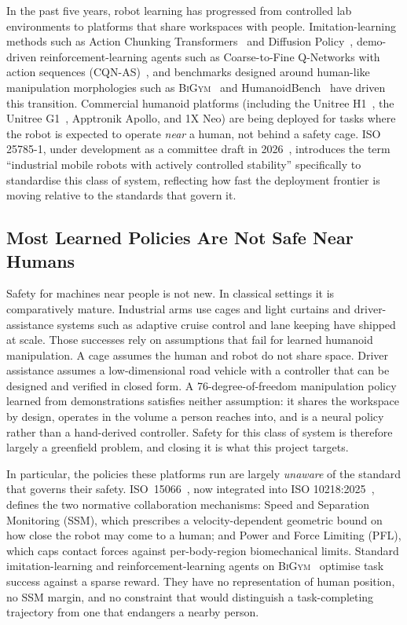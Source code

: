 \documentclass[11pt,a4paper]{report}
\newcommand{\ssm}{SSM}
\newcommand{\pfl}{PFL}
\newcommand{\iso}{ISO~15066}
\newcommand{\bigym}{\textsc{BiGym}}
\newcommand{\cqnas}{CQN-AS}
\begin{document}
In the past five years, robot learning has progressed from
controlled lab environments to platforms that share workspaces with
people. Imitation-learning methods such as Action Chunking
Transformers~\cite{zhao2023act} and Diffusion
Policy~\cite{chi2023diffusion}, demo-driven reinforcement-learning
agents such as Coarse-to-Fine Q-Networks with action sequences
(\cqnas{})~\cite{seo2024cqnas,seo2025actionsequence}, and benchmarks designed around
human-like manipulation morphologies such as
\bigym{}~\cite{chernyadev2024bigym} and
HumanoidBench~\cite{sferrazza2024humanoidbench} have driven this
transition. Commercial humanoid platforms (including the Unitree
H1~\cite{unitree_h1}, the Unitree G1~\cite{unitree_g1},
Apptronik Apollo, and 1X Neo) are being deployed for tasks where the
robot is expected to operate \emph{near} a human, not behind a
safety cage. ISO 25785-1, under development as a committee draft in
2026~\cite{iso25785},
introduces the term ``industrial mobile robots with actively
controlled stability'' specifically to standardise this class of
system, reflecting how fast the deployment frontier is moving
relative to the standards that govern it.

\subsection{Most Learned Policies Are Not Safe Near Humans}
\label{sec:intro:mot:unsafe}

Safety for machines near people is not new. In classical settings it
is comparatively mature. Industrial arms use cages and light curtains and
driver-assistance systems such as adaptive cruise control and lane
keeping have shipped at scale. Those successes rely on
assumptions that fail for learned humanoid manipulation. A cage assumes
the human and robot do not share space. Driver assistance assumes a
low-dimensional road vehicle with a controller that can be designed
and verified in closed form. A 76-degree-of-freedom manipulation policy
learned from demonstrations satisfies neither assumption: it shares the
workspace by design, operates in the volume a person reaches into, and
is a neural policy rather than a hand-derived controller. Safety for
this class of system is therefore largely a greenfield problem, and
closing it is what this project targets.

In particular, the policies these platforms run are largely
\emph{unaware} of the standard that governs their safety. \iso{}~\cite{iso15066}, now
integrated into ISO 10218:2025~\cite{iso10218,hartmann2026iso}, defines the two
normative collaboration mechanisms: Speed and Separation Monitoring
(\ssm{}), which prescribes a velocity-dependent geometric bound on
how close the robot may come to a human; and Power and Force
Limiting (\pfl{}), which caps contact forces against per-body-region
biomechanical limits. Standard imitation-learning and
reinforcement-learning agents on
\bigym{}~\cite{chernyadev2024bigym} optimise task success against a
sparse reward. They have no representation of human position, no
\ssm{} margin, and no constraint that would distinguish a
task-completing trajectory from one that endangers a nearby person.
\end{document}
